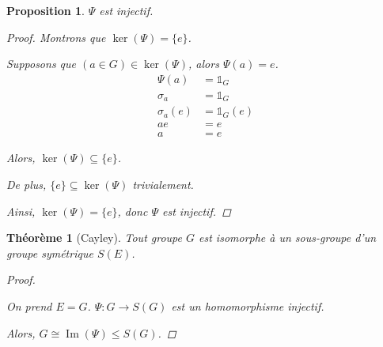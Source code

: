 \documentclass{report}
\newcommand*{\lte}{\leqslant}
\newcommand*{\identite}{\mathds{1}}
\newcommand*{\image}{\operatorname{Im}}
\newtheorem*{thm}{Th\'eor\`eme}
\newtheorem*{prop}{Proposition}
\theoremstyle{definition}
\theoremstyle{remark}
\begin{document}
	
	\begin{prop}
		$\Psi$ est injectif.
		\begin{proof}
			Montrons que $\ker(\Psi)=\{e\}$.

			Supposons que $(a \in G) \in \ker(\Psi)$, alors $\Psi(a)=e$.
			\begin{align*}
				\Psi(a)&= \identite_G\\
				\sigma_a&= \identite_G\\
				\sigma_a(e)&= \identite_G(e)\\
				ae&= e\\
				a&= e
			\end{align*}

			Alors, $\ker(\Psi) \subseteq \{e\}$.

			De plus, $\{e\} \subseteq \ker(\Psi)$ trivialement.

			Ainsi, $\ker(\Psi) = \{e\}$, donc $\Psi$ est injectif.
		\end{proof}
	\end{prop}
	\begin{thm}[Cayley]
		Tout groupe $G$ est isomorphe \`a un sous-groupe d'un groupe sym\'etrique $S(E)$.
		\begin{proof}~

			On prend $E=G$. $\Psi:G \to S(G)$ est un homomorphisme injectif.

			Alors, $G \cong \image(\Psi) \lte S(G)$.
		\end{proof}
	\end{thm}
\end{document}
